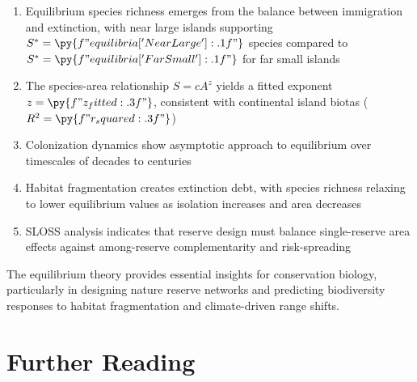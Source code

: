 \documentclass[a4paper, 11pt]{article}
\begin{document}
\begin{enumerate}
\item Equilibrium species richness emerges from the balance between immigration and extinction, with near large islands
supporting $S^* = \py{f"{equilibria['Near Large']:.1f}"}$ species compared to $S^* = \py{f"{equilibria['Far Small']:.1f}"}$ for far small islands
\item The species-area relationship $S = cA^z$ yields a fitted exponent $z = \py{f"{z_fitted:.3f}"}$, consistent with
continental island biotas ($R^2 = \py{f"{r_squared:.3f}"}$)
\item Colonization dynamics show asymptotic approach to equilibrium over timescales of decades to centuries
\item Habitat fragmentation creates extinction debt, with species richness relaxing to lower equilibrium values as
isolation increases and area decreases
\item SLOSS analysis indicates that reserve design must balance single-reserve area effects against among-reserve
complementarity and risk-spreading
\end{enumerate}

The equilibrium theory provides essential insights for conservation biology, particularly in designing nature reserve
networks and predicting biodiversity responses to habitat fragmentation and climate-driven range shifts.

\section*{Further Reading}
\end{document}
